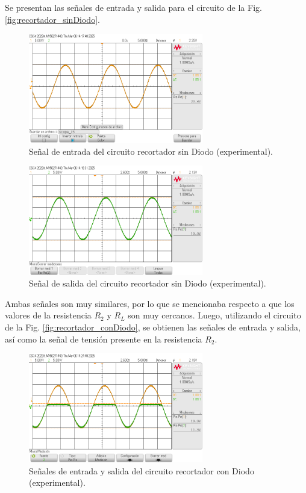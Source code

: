\documentclass[journal]{IEEEtran}
\begin{document}
Se presentan las señales de entrada y salida para el circuito de la Fig. \ref{fig:recortador_sinDiodo}.
\begin{figure}[H]
        \centering
        \includegraphics[width=3in]{SignalExperimental_01.png}
        \caption{Señal de entrada del circuito recortador sin Diodo (experimental).}
        \label{fig:SignalExperimental_01}
\end{figure}
\begin{figure}[H]
        \centering
        \includegraphics[width=3in]{SignalExperimental_02.png}
        \caption{Señal de salida del circuito recortador sin Diodo (experimental).}
        \label{fig:SignalExperimental_02}
\end{figure}

Ambas señales son muy similares, por lo que se mencionaba respecto a que los valores de la resistencia $R_2$ y $R_L$ son muy cercanos. Luego,
utilizando el circuito de la Fig. \ref{fig:recortador_conDiodo}, se obtienen las señales de entrada y salida, así como la señal de tensión presente en la resistencia $R_2$.

\begin{figure}[H]
        \centering
        \includegraphics[width=3in]{SignalExperimental_03.png}
        \caption{Señales de entrada y salida del circuito recortador con Diodo (experimental).}
        \label{fig:SignalExperimental_03}
\end{figure}
\end{document}
